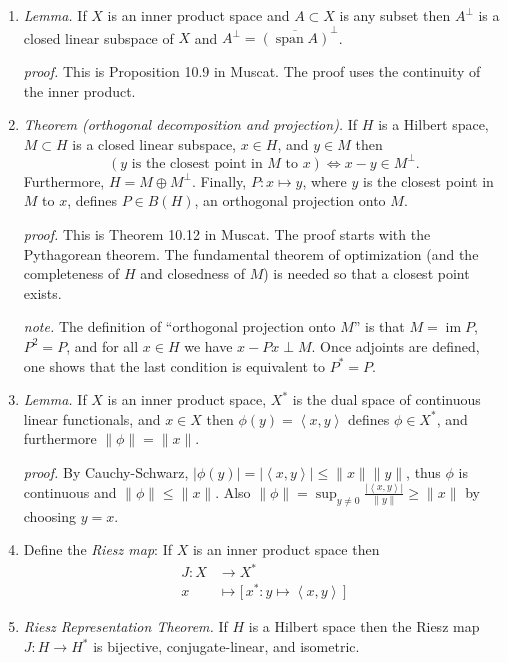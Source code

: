\documentclass[11pt]{article}
\newcommand{\ip}[2]{\ensuremath{\left<#1,#2\right>}}
\newcommand{\image}{\operatorname{im}}
\begin{document}
\begin{enumerate}
\item \emph{Lemma.} If $X$ is an inner product space and $A\subset X$ is any subset then $A^\perp$ is a closed linear subspace of $X$ and $A^\perp = \overline{(\operatorname{span} A)}^\perp$.

\emph{proof.} This is Proposition 10.9 in Muscat.  The proof uses the continuity of the inner product.

\item \emph{Theorem (orthogonal decomposition and projection).}  If $H$ is a Hilbert space, $M\subset H$ is a closed linear subspace, $x\in H$, and $y\in M$ then
    $$\left(y \text{ is the closest point in $M$ to } x\right) \iff x-y \in M^\perp.$$
Furthermore, $H=M\oplus M^\perp$.  Finally, $P:x\mapsto y$, where $y$ is the closest point in $M$ to $x$, defines $P\in B(H)$, an orthogonal projection onto $M$.

\emph{proof.}  This is Theorem 10.12 in Muscat.  The proof starts with the Pythagorean theorem.  The fundamental theorem of optimization (and the completeness of $H$ and closedness of $M$) is needed so that a closest point exists.

\emph{note.}  The definition of ``orthogonal projection onto $M$'' is that $M=\image P$, $P^2=P$, and for all $x\in H$ we have $x-Px \perp M$.  Once adjoints are defined, one shows that the last condition is equivalent to $P^*=P$.

\item \emph{Lemma.}  If $X$ is an inner product space, $X^*$ is the dual space of continuous linear functionals, and $x\in X$ then $\phi(y) = \ip{x}{y}$ defines $\phi\in X^*$, and furthermore $\|\phi\| = \|x\|$.

\emph{proof.} By Cauchy-Schwarz, $|\phi(y)| = |\ip{x}{y}| \le \|x\|\|y\|$, thus $\phi$ is continuous and $\|\phi\|\le \|x\|$.  Also $\|\phi\|=\sup_{y\ne 0} \frac{|\ip{x}{y}|}{\|y\|} \ge \|x\|$ by choosing $y=x$.

\item Define the \emph{Riesz map}:  If $X$ is an inner product space then
\begin{align*}
J:X &\to X^* \\
  x &\mapsto \big[\,x^*: y\mapsto \ip{x}{y}\,\big]
\end{align*}

\item \emph{Riesz Representation Theorem.}  If $H$ is a Hilbert space then the Riesz map $J:H \to H^*$ is bijective, conjugate-linear, and isometric.


\end{enumerate}
\end{document}
